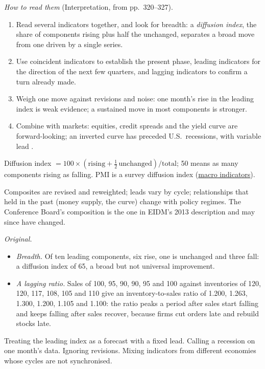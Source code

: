 \begin{qfmethod}
\emph{How to read them} (Interpretation, from pp.~320--327).
\begin{enumerate}
\item Read several indicators together, and look for breadth: a \emph{diffusion index}, the share of components rising plus half the unchanged, separates a broad move from one driven by a single series.
\item Use coincident indicators to establish the present phase, leading indicators for the direction of the next few quarters, and lagging indicators to confirm a turn already made.
\item Weigh one move against revisions and noise: one month's rise in the leading index is weak evidence; a sustained move in most components is stronger.
\item Combine with markets: equities, credit spreads and the yield curve are forward-looking; an inverted curve has preceded U.S.\ recessions, with variable lead \citep[pp.~4--5]{estrella-trubin-2006}.
\end{enumerate}

 Diffusion index $=100\times(\text{rising}+\tfrac12\,\text{unchanged})/\text{total}$; 50 means as many components rising as falling. PMI is a survey diffusion index (\hyperref[def:macroeconomic-indicators]{macro indicators}).

 Composites are revised and reweighted; leads vary by cycle; relationships that held in the past (money supply, the curve) change with policy regimes. The Conference Board's composition is the one in EIDM's 2013 description and may since have changed.

 \emph{Original.}
\begin{itemize}
\item \emph{Breadth.} Of ten leading components, six rise, one is unchanged and three fall: a diffusion index of 65, a broad but not universal improvement.
\item \emph{A lagging ratio.} Sales of 100, 95, 90, 90, 95 and 100 against inventories of 120, 120, 117, 108, 105 and 110 give an inventory-to-sales ratio of 1.200, 1.263, 1.300, 1.200, 1.105 and 1.100: the ratio peaks a period after sales start falling and keeps falling after sales recover, because firms cut orders late and rebuild stocks late.
\end{itemize}

 Treating the leading index as a forecast with a fixed lead. Calling a recession on one month's data. Ignoring revisions. Mixing indicators from different economies whose cycles are not synchronised.


\end{qfmethod}
